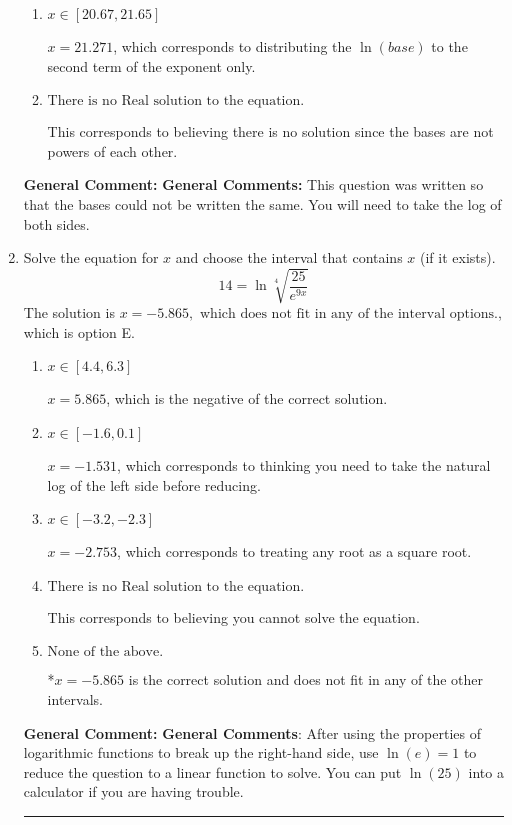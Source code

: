 \documentclass{extbook}[14pt]
\newcommand{\litem}[1]{\item #1

\rule{\textwidth}{0.4pt}}
\begin{document}
\begin{enumerate}
{\begin{enumerate}[label=\Alph*.]
* $x = 0.793$, which is the correct option.
\item \( x \in [20.67, 21.65] \)

$x = 21.271$, which corresponds to distributing the $\ln(base)$ to the second term of the exponent only.
\item \( \text{There is no Real solution to the equation.} \)

This corresponds to believing there is no solution since the bases are not powers of each other.
\end{enumerate}

\textbf{General Comment:} \textbf{General Comments:} This question was written so that the bases could not be written the same. You will need to take the log of both sides.
}
\litem{
 Solve the equation for $x$ and choose the interval that contains $x$ (if it exists).
\[  14 = \ln{\sqrt[4]{\frac{25}{e^{9x}}}} \]The solution is \( x = -5.865, \text{ which does not fit in any of the interval options.} \), which is option E.\begin{enumerate}[label=\Alph*.]
\item \( x \in [4.4, 6.3] \)

$x = 5.865$, which is the negative of the correct solution.
\item \( x \in [-1.6, 0.1] \)

$x = -1.531$, which corresponds to thinking you need to take the natural log of the left side before reducing.
\item \( x \in [-3.2, -2.3] \)

$x = -2.753$, which corresponds to treating any root as a square root.
\item \( \text{There is no Real solution to the equation.} \)

This corresponds to believing you cannot solve the equation.
\item \( \text{None of the above.} \)

*$x = -5.865$ is the correct solution and does not fit in any of the other intervals.
\end{enumerate}

\textbf{General Comment:} \textbf{General Comments}: After using the properties of logarithmic functions to break up the right-hand side, use $\ln(e) = 1$ to reduce the question to a linear function to solve. You can put $\ln(25)$ into a calculator if you are having trouble.
}
\end{enumerate}
\end{document}
